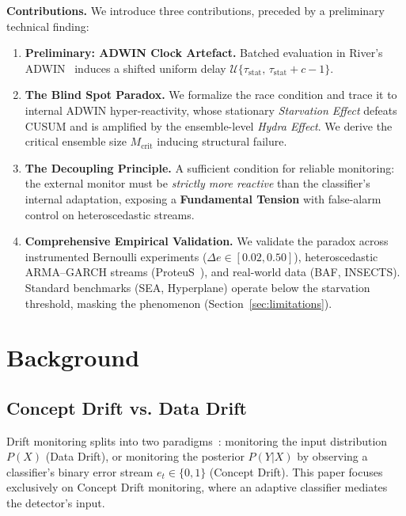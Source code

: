 \documentclass[10pt,conference]{IEEEtran}
\theoremstyle{definition}
\begin{document}
\noindent\textbf{Contributions.}
We introduce three contributions, preceded by a preliminary technical finding:
\begin{enumerate}[nosep, label=\textbf{(C\arabic*)}, start=1]
  \item[\textbf{(P)}] \textbf{Preliminary: ADWIN Clock Artefact.} Batched evaluation in River's ADWIN~\cite{montiel_river_2021} induces a shifted uniform delay $\mathcal{U}\{\tau_{\mathrm{stat}},\, \tau_{\mathrm{stat}} + c - 1\}$.
  \item \textbf{The Blind Spot Paradox.} We formalize the race condition and trace it to internal ADWIN hyper-reactivity, whose stationary \emph{Starvation Effect} defeats CUSUM and is amplified by the ensemble-level \emph{Hydra Effect}. We derive the critical ensemble size $M_{\mathrm{crit}}$ inducing structural failure.
  \item \textbf{The Decoupling Principle.} A sufficient condition for reliable monitoring: the external monitor must be \emph{strictly more reactive} than the classifier's internal adaptation, exposing a \textbf{Fundamental Tension} with false-alarm control on heteroscedastic streams.
  \item \textbf{Comprehensive Empirical Validation.} We validate the paradox across instrumented Bernoulli experiments ($\Delta e \in [0.02, 0.50]$), heteroscedastic ARMA--GARCH streams (ProteuS~\cite{suarez_cetrulo_proteus_2025}), and real-world data (BAF, INSECTS). Standard benchmarks (SEA, Hyperplane) operate below the starvation threshold, masking the phenomenon (Section~\ref{sec:limitations}).
\end{enumerate}

\section{Background}\label{sec:background}

\subsection{Concept Drift vs. Data Drift}
Drift monitoring splits into two paradigms~\cite{gama_survey_2014, lu_concept_drift_2018}: monitoring the input distribution $P(X)$ (Data Drift), or monitoring the posterior $P(Y|X)$ by observing a classifier's binary error stream $e_t \in \{0,1\}$ (Concept Drift). This paper focuses exclusively on Concept Drift monitoring, where an adaptive classifier mediates the detector's input.
\end{document}
